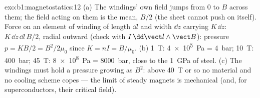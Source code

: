 \begin{solution}{exo:b1:magnetostatics:12}
(a) The windings' own field jumps from $0$ to $B$ across them; the
field acting on them is the mean, $B/2$ (the sheet cannot push on
itself). Force on an element of winding of length $\dd l$ and width $\dd z$
carrying $K\,\dd z$: $K\,\dd z\,\dd l\,B/2$, radial outward (check with $I\,\dd\vect l
\wedge\vect B$): pressure $p = KB/2 = B^2/2\mu_0$ since $K = nI = B/\mu_0$.
(b) \qty{1}{T}: \qty{4e5}{Pa} = \qty{4}{bar}; \qty{10}{T}: \qty{400}{bar}; \qty{45}{T}:
\qty{8e8}{Pa} = \qty{8000}{bar}, close to the \qty{1}{GPa} of steel. (c) The
windings must hold a pressure growing as $B^2$: above \qty{40}{T} or so
no material and no cooling scheme copes --- the limit of steady magnets
is mechanical (and, for superconductors, their critical field).
\end{solution}


